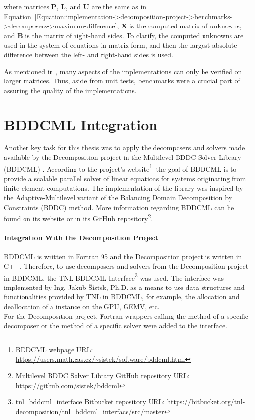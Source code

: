 where matrices $\mathbf{P}$, $\mathbf{L}$, and $\mathbf{U}$ are the same as in Equation~\ref{Equation:implementation->decomposition-project->benchmarks->decomposers->maximum-difference}, $\mathbf{X}$ is the computed matrix of unknowns, and $\mathbf{B}$ is the matrix of right-hand sides. To clarify, the computed unknowns are used in the system of equations in matrix form, and then the largest absolute difference between the left- and right-hand sides is used.

As mentioned in  \cite{Cejka2022}, many aspects of the implementations can only be verified on larger matrices. Thus, aside from unit tests, benchmarks were a crucial part of assuring the quality of the implementations.




\section{BDDCML Integration}\label{Section:implementation->BDDCML}
Another key task for this thesis was to apply the decomposers and solvers made available by the Decomposition project in the Multilevel BDDC Solver Library (BDDCML) \cite{Sistek2011, Sistek2012, Sousedik2013, Sistek2015}. According to the project's website\footnote{\label{Footnote:implementation->BDDCML-integration->BDDCML-webpage}BDDCML webpage URL: \url{https://users.math.cas.cz/~sistek/software/bddcml.html}}, the goal of BDDCML is to provide a scalable parallel solver of linear equations for systems originating from finite element computations. The implementation of the library was inspired by the Adaptive-Multilevel variant of the Balancing Domain Decomposition by Constraints (BDDC) method. More information regarding BDDCML can be found on its website or in its GitHub repository\footnote{Multilevel BDDC Solver Library GitHub repository URL: \url{https://github.com/sistek/bddcml}}.

\paragraph{Integration With the Decomposition Project} BDDCML is written in Fortran 95 and the Decomposition project is written in C++. Therefore, to use decomposers and solvers from the Decomposition project in BDDCML, the TNL-BDDCML Interface\footnote{tnl\_bddcml\_interface Bitbucket repository URL: \url{https://bitbucket.org/tnl-decomposition/tnl_bddcml_interface/src/master}} was used. The interface was implemented by Ing. Jakub Šístek, Ph.D. as a means to use data structures and functionalities provided by TNL in BDDCML, for example, the allocation and deallocation of a  instance on the GPU, GEMV, etc.\\
For the Decomposition project, Fortran wrappers calling the  method of a specific decomposer or the  method of a specific solver were added to the interface.

